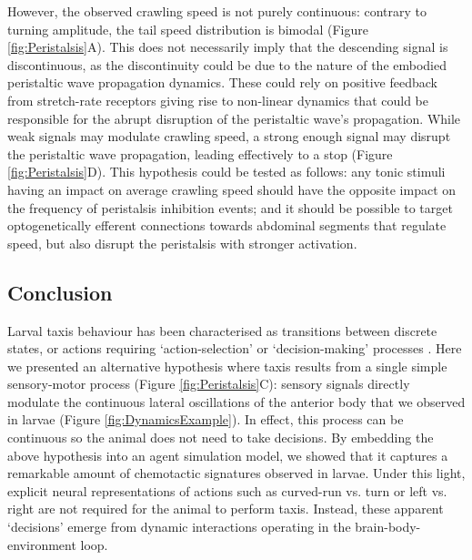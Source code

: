 \documentclass[11pt,a4paper]{article}
\newcommand{\todoBW}[1]{\todo[author=BW,color=orange, size=\tiny,inline]{1}}
\begin{document}
However, the observed crawling speed is not purely continuous: contrary to turning amplitude, the tail speed distribution is bimodal (Figure \ref{fig:Peristalsis}A).
 This does not necessarily imply that the descending signal is discontinuous, as the discontinuity could be due to the nature of the embodied peristaltic wave propagation dynamics. These could rely on positive feedback from stretch-rate receptors \citep{ross2015model} giving rise to non-linear dynamics that could be responsible for the abrupt disruption of the peristaltic wave's propagation. While weak signals may modulate crawling speed, a strong enough signal may disrupt the peristaltic wave propagation, leading effectively to a stop (Figure \ref{fig:Peristalsis}D).
  This hypothesis could be tested as follows: any tonic stimuli having an impact on average crawling speed should have the opposite impact on the frequency of peristalsis inhibition events; and it should be possible to target optogenetically efferent connections towards abdominal segments that regulate speed, but also disrupt the peristalsis with stronger activation.

\subsection{Conclusion}
Larval taxis behaviour has been characterised as transitions between discrete states, or actions \citep{green1983organization, cobbwhatandhow1999, gomez2012active}  requiring ‘action-selection’ or ‘decision-making’ processes \citep{gomez2014multilevel}. Here we presented an alternative hypothesis where taxis results from a single simple sensory-motor process (Figure \ref{fig:Peristalsis}C): sensory signals directly modulate the continuous lateral oscillations of the anterior body that we observed in larvae (Figure \ref{fig:DynamicsExample}). In effect, this process can be continuous so the animal does not need to take decisions. By embedding the above hypothesis into an agent simulation model, we showed that it captures a remarkable amount of chemotactic signatures observed in larvae.  Under this light, explicit neural representations of actions such as curved-run vs. turn or left vs. right are not required for the animal to perform taxis. Instead, these apparent `decisions' emerge from dynamic interactions operating in the brain-body-environment loop.
\end{document}

